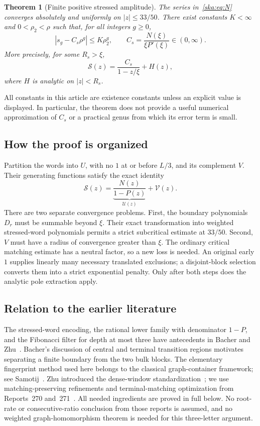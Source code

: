 \documentclass[11pt,letterpaper]{article}
\newtheorem{theorem}{Theorem}[section]
\theoremstyle{definition}
\newcommand{\cS}{\mathcal S}\newcommand{\cU}{\mathcal U}
\newcommand{\cV}{\mathcal V}\newcommand{\cT}{\mathcal T}
\begin{document}
\begin{theorem}[Finite positive stressed amplitude]\label{ska:thm:main}
The series in~\eqref{ska:eq:N} converges absolutely and uniformly on $|z|\le33/50$. There exist constants $K<\infty$ and $0<\rho_2<\rho$ such that, for all integers $g\ge0$,
\begin{equation}\label{ska:eq:main}
\left|s_g-C_s\rho^g\right|\le K\rho_2^g,
\qquad
C_s=\frac{N(\xi)}{\xi P'(\xi)}\in(0,\infty).
\end{equation}
More precisely, for some $R_s>\xi$,
\begin{equation}\label{ska:eq:simplepole}
\cS(z)=\frac{C_s}{1-z/\xi}+H(z),
\end{equation}
where $H$ is analytic on $|z|<R_s$.
\end{theorem}

All constants in this article are existence constants unless an explicit value is displayed. In particular, the theorem does not provide a useful numerical approximation of $C_s$ or a practical genus from which its error term is small.

\subsection{How the proof is organized}
Partition the words into $U$, with no $1$ at or before $L/3$, and its complement $V$. Their generating functions satisfy the exact identity
\begin{equation}\label{ska:eq:proofmap}
\cS(z)=\underbrace{\frac{N(z)}{1-P(z)}}_{\cU(z)}+\cV(z).
\end{equation}
There are two separate convergence problems. First, the boundary polynomials $D_r$ must be summable beyond $\xi$. Their exact transformation into weighted stressed-word polynomials permits a strict subcritical estimate at $33/50$. Second, $V$ must have a radius of convergence greater than $\xi$. The ordinary critical matching estimate has a neutral factor, so a new loss is needed. An original early $1$ supplies linearly many necessary translated exclusions; a disjoint-block selection converts them into a strict exponential penalty. Only after both steps does the analytic pole extraction apply.

\subsection{Relation to the earlier literature}
The stressed-word encoding, the rational lower family with denominator $1-P$, and the Fibonacci filter for depth at most three have antecedents in Bacher and Zhu~\cite{Bacher,Zhu}. Bacher's discussion of central and terminal transition regions motivates separating a finite boundary from the two bulk blocks. The elementary fingerprint method used here belongs to the classical graph-container framework; see Samotij~\cite{Samotij}. Zhu introduced the dense-window standardization~\cite[Sections~5.4--5.5]{Zhu}; we use matching-preserving refinements and terminal-matching optimization from Reports~270 and~271~\cite{Report270,Report271}. All needed ingredients are proved in full below. No root-rate or consecutive-ratio conclusion from those reports is assumed, and no weighted graph-homomorphism theorem is needed for this three-letter argument.
\end{document}
